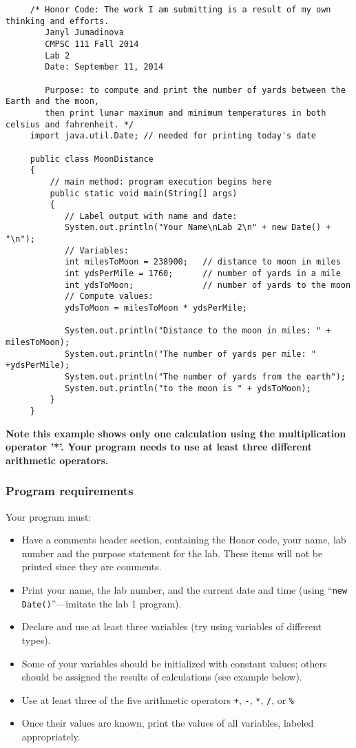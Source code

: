 \begin{verbatim}
     /* Honor Code: The work I am submitting is a result of my own thinking and efforts.
        Janyl Jumadinova
        CMPSC 111 Fall 2014
        Lab 2
        Date: September 11, 2014
     
        Purpose: to compute and print the number of yards between the Earth and the moon, 
        then print lunar maximum and minimum temperatures in both celsius and fahrenheit. */
     import java.util.Date; // needed for printing today's date
     
     public class MoonDistance
     {
         // main method: program execution begins here
         public static void main(String[] args)
         {
            // Label output with name and date:
            System.out.println("Your Name\nLab 2\n" + new Date() + "\n");     
            // Variables:
            int milesToMoon = 238900;   // distance to moon in miles
            int ydsPerMile = 1760;      // number of yards in a mile
            int ydsToMoon;              // number of yards to the moon           
            // Compute values:
            ydsToMoon = milesToMoon * ydsPerMile;
            
            System.out.println("Distance to the moon in miles: " + milesToMoon);
            System.out.println("The number of yards per mile: " +ydsPerMile);
            System.out.println("The number of yards from the earth");
            System.out.println("to the moon is " + ydsToMoon);
         }
     }
\end{verbatim}

\noindent \textbf{Note this example shows only one calculation using the multiplication operator '*'. Your program needs to use at least three different arithmetic operators. }

\subsubsection*{Program requirements}
\noindent Your program must:
\begin{itemize}
\item
Have a  comments header section, containing the Honor code, your name, lab number and the purpose statement for the lab. These items will not be printed since they are comments.
\item
Print your name, the lab number, and the current date and time (using
``{\tt new Date()}''---imitate the lab 1 program).
\item
Declare and use at least three variables (try using variables of different types).
\item
Some of your variables should be initialized with constant values; others
should be assigned the results of calculations (see example below). 
\item
Use at least three of the five arithmetic operators \verb$+$, \verb$-$, \verb$*$,
\verb$/$, or \verb$%$
\item
Once their values are known, print the values of all variables, labeled appropriately. 
\end{itemize}


